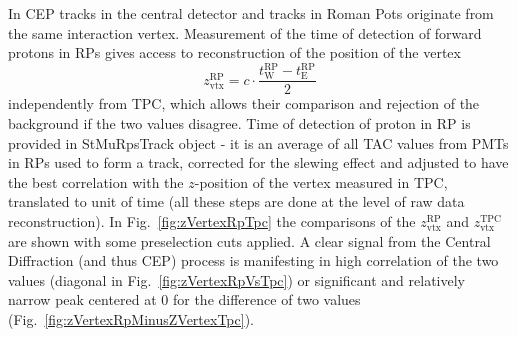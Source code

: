 In CEP tracks in the central detector and tracks in Roman Pots originate from the same interaction vertex. Measurement of the time of detection of forward protons in RPs gives access to reconstruction of the position of the vertex
\begin{equation}
z_{\text{vtx}}^{\text{RP}} = c\cdot\frac{t^{\text{RP}}_{\text{W}} - t^{\text{RP}}_{\text{E}}}{2}
\end{equation}
independently from TPC, which allows their comparison and rejection of the background if the two values disagree. Time of detection of proton in RP is provided in StMuRpsTrack object - it is an average of all TAC values from PMTs in RPs used to form a track, corrected for the slewing effect and adjusted to have the best correlation with the $z$-position of the vertex measured in TPC, translated to unit of time (all these steps are done at the level of raw data reconstruction). In Fig.~\ref{fig:zVertexRpTpc} the comparisons of the $z_{\text{vtx}}^{\text{RP}}$ and $z_{\text{vtx}}^{\text{TPC}}$ are shown with some preselection cuts applied. A clear signal from the Central Diffraction (and thus CEP) process is manifesting in high correlation of the two values (diagonal in Fig.~\ref{fig:zVertexRpVsTpc}) or significant and relatively narrow peak centered at 0 for the difference of two values (Fig.~\ref{fig:zVertexRpMinusZVertexTpc}). %
